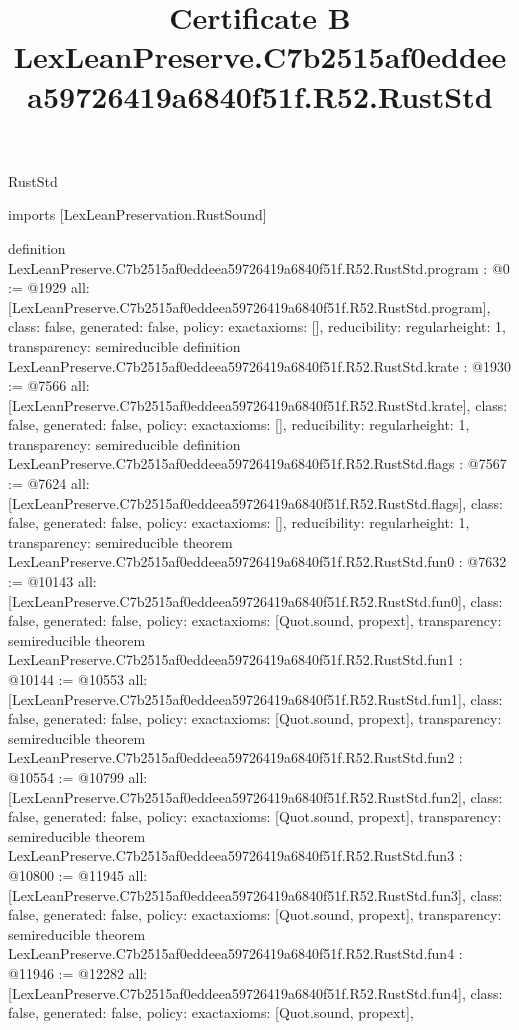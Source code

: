 \begin{lexlean}{RustStd}
\title{Certificate B LexLeanPreserve.C7b2515af0eddeea59726419a6840f51f.R52.RustStd}
\begin{coremodule}
imports [LexLeanPreservation.RustSound]

definition LexLeanPreserve.C7b2515af0eddeea59726419a6840f51f.R52.RustStd.program : @0 := @1929 {
  all: [LexLeanPreserve.C7b2515af0eddeea59726419a6840f51f.R52.RustStd.program],
  class: false,
  generated: false,
  policy: exact{axioms: []},
  reducibility: regular{height: 1},
  transparency: semireducible
}
definition LexLeanPreserve.C7b2515af0eddeea59726419a6840f51f.R52.RustStd.krate : @1930 := @7566 {
  all: [LexLeanPreserve.C7b2515af0eddeea59726419a6840f51f.R52.RustStd.krate],
  class: false,
  generated: false,
  policy: exact{axioms: []},
  reducibility: regular{height: 1},
  transparency: semireducible
}
definition LexLeanPreserve.C7b2515af0eddeea59726419a6840f51f.R52.RustStd.flags : @7567 := @7624 {
  all: [LexLeanPreserve.C7b2515af0eddeea59726419a6840f51f.R52.RustStd.flags],
  class: false,
  generated: false,
  policy: exact{axioms: []},
  reducibility: regular{height: 1},
  transparency: semireducible
}
theorem LexLeanPreserve.C7b2515af0eddeea59726419a6840f51f.R52.RustStd.fun0 : @7632 := @10143 {
  all: [LexLeanPreserve.C7b2515af0eddeea59726419a6840f51f.R52.RustStd.fun0],
  class: false,
  generated: false,
  policy: exact{axioms: [Quot.sound, propext]},
  transparency: semireducible
}
theorem LexLeanPreserve.C7b2515af0eddeea59726419a6840f51f.R52.RustStd.fun1 : @10144 := @10553 {
  all: [LexLeanPreserve.C7b2515af0eddeea59726419a6840f51f.R52.RustStd.fun1],
  class: false,
  generated: false,
  policy: exact{axioms: [Quot.sound, propext]},
  transparency: semireducible
}
theorem LexLeanPreserve.C7b2515af0eddeea59726419a6840f51f.R52.RustStd.fun2 : @10554 := @10799 {
  all: [LexLeanPreserve.C7b2515af0eddeea59726419a6840f51f.R52.RustStd.fun2],
  class: false,
  generated: false,
  policy: exact{axioms: [Quot.sound, propext]},
  transparency: semireducible
}
theorem LexLeanPreserve.C7b2515af0eddeea59726419a6840f51f.R52.RustStd.fun3 : @10800 := @11945 {
  all: [LexLeanPreserve.C7b2515af0eddeea59726419a6840f51f.R52.RustStd.fun3],
  class: false,
  generated: false,
  policy: exact{axioms: [Quot.sound, propext]},
  transparency: semireducible
}
theorem LexLeanPreserve.C7b2515af0eddeea59726419a6840f51f.R52.RustStd.fun4 : @11946 := @12282 {
  all: [LexLeanPreserve.C7b2515af0eddeea59726419a6840f51f.R52.RustStd.fun4],
  class: false,
  generated: false,
  policy: exact{axioms: [Quot.sound, propext]},
}
\end{coremodule}
\end{lexlean}
